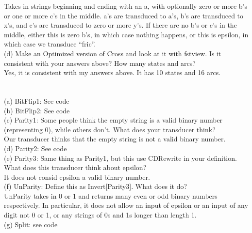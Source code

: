 \documentclass[11pt]{article} %
\begin{document}
Takes in strings beginning and ending with an a, with optionally zero or more b’s or one or more c’s in the middle. a’s are transduced to a’s, b’s are transduced to x’s, and c’s are transduced to zero or more y’s. If there are no b’s or c’s in the middle, either this is zero b’s, in which case nothing happens, or this is epsilon, in which case we transduce ``fric”.\\


(d) Make an Optimized version of Cross and look at it with fstview. Is it consistent with your answers above? How many states and arcs? \\

Yes, it is consistent with my answers above. It has 10 states and 16 arcs.\\

\newpage

\section{}

(a) BitFlip1: See code\\

(b) BitFlip2: See code \\

(c) Parity1: Some people think the empty string  is a valid binary number (representing 0), while others don’t. What does your transducer think?\\

Our transducer thinks that the empty string is not a valid binary number.\\
(d) Parity2: See code\\


(e) Parity3: Same thing as Parity1, but this use CDRewrite in your definition. What does this transducer think about epsilon? \\

It does not consid epsilon a valid binary number.\\

(f) UnParity: Define this as Invert[Parity3]. What does it do?\\

UnParity takes in 0 or 1 and returns many even or odd binary numbers respectively. In particular, it does not allow an input of epsilon or an input of any digit not 0 or 1, or any strings of 0s and 1s longer than length 1.\\

(g) Split: see code\\
\end{document}
